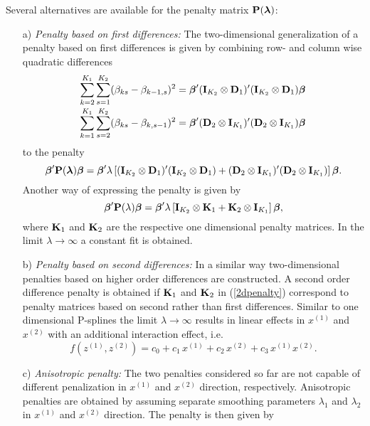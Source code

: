 \documentclass[11pt,a4paper,twoside]{bayesxarticle}
\begin{document}
Several alternatives are available for the penalty matrix $\mathbf{P}(\boldsymbol{\lambda})$:
\begin{enumerate}
\item[a)] {\em Penalty based on first differences:} The
two-dimensional generalization of a penalty based on first
differences is given by combining row- and column wise quadratic
differences
$$
\begin{array}{l}
\displaystyle \sum_{k=2}^{K_1}\sum_{s=1}^{K_2}(\beta_{ks}-\beta_{k-1,s})^2 =
\boldsymbol{\beta}'(\mathbf{I}_{K_2}\otimes \mathbf{D}_1)'(\mathbf{I}_{K_2}\otimes \mathbf{D}_1)\boldsymbol{\beta} \\[0.4cm]
\displaystyle  \sum_{k=1}^{K_1}\sum_{s=2}^{K_2}(\beta_{ks}-\beta_{k,s-1})^2 =
\boldsymbol{\beta}'(\mathbf{D}_2\otimes \mathbf{I}_{K_1})'(\mathbf{D}_2\otimes \mathbf{I}_{K_1})\boldsymbol{\beta} \\
\end{array}
$$
to the penalty
$$
\boldsymbol{\beta}'\mathbf{P}(\boldsymbol{\lambda}) \boldsymbol{\beta} =  \boldsymbol{\beta}' \lambda \left[ (\mathbf{I}_{K_2}\otimes \mathbf{D}_1)'(\mathbf{I}_{K_2}\otimes \mathbf{D}_1) + (\mathbf{D}_2\otimes \mathbf{I}_{K_1})'
(\mathbf{D}_2\otimes \mathbf{I}_{K_1})\right]\boldsymbol{\beta}.
$$
Another way of expressing the penalty is given by
\begin{equation}
\label{2dpenalty}
 \betavec'\Pvec(\lambda)\betavec = \betavec'\lambda \left[\Ivec_{K_2}\otimes\Kvec_1 + \Kvec_2\otimes \Ivec_{K_1}\right]\betavec,
\end{equation}
where $\mathbf{K}_1$ and $\mathbf{K}_2$ are the respective one dimensional penalty matrices.
In the limit  $\lambda \rightarrow \infty$ a constant fit is obtained.
\item[b)] {\em Penalty based on second differences:} In a similar way two-dimensional penalties based on higher order differences
are constructed. A second order difference penalty is obtained if
$\mathbf{K}_1$ and $\mathbf{K}_2$ in (\ref{2dpenalty}) correspond to penalty
matrices based on second rather than first differences. Similar to
one dimensional P-splines the limit $\lambda \rightarrow \infty$
results in linear effects in $x^{(1)}$ and $x^{(2)}$ with an
additional interaction effect, i.e.
$$
f\left(z^{(1)},z^{(2)}\right) = c_0 + c_1 \, x^{(1)} + c_2 \,
x^{(2)} + c_3 \, x^{(1)} x^{(2)}.
$$
\item[c)] {\em Anisotropic penalty:} The two penalties considered so far are not capable of
different penalization in $x^{(1)}$ and $x^{(2)}$ direction,
respectively. Anisotropic penalties are obtained by assuming
separate smoothing parameters $\lambda_1$ and $\lambda_2$ in
$x^{(1)}$ and $x^{(2)}$ direction. The penalty is then given by
\begin{equation}

\end{equation}
\end{enumerate}
\end{document}
